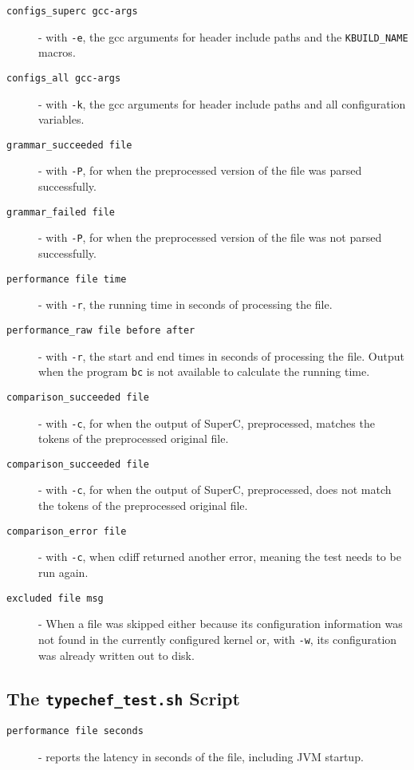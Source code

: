 \documentclass{article}
\newcommand{\SuperC}{{\textsf{Su\-perC}}}
\begin{document}
\begin{description}
\item[\texttt{configs\_superc gcc-args}] - with \verb"-e", the gcc
  arguments for header include paths and the \verb"KBUILD_NAME"
  macros.
\item[\texttt{configs\_all gcc-args}] - with \verb"-k", the gcc
  arguments for header include paths and all configuration variables.
\item[\texttt{grammar\_succeeded file}] - with \verb"-P", for when the
  preprocessed version of the file was parsed successfully.
\item[\texttt{grammar\_failed file}] - with \verb"-P", for when the
  preprocessed version of the file was not parsed successfully.
\item[\texttt{performance file time}] - with \verb"-r", the running
  time in seconds of processing the file.
\item[\texttt{performance\_raw file before after}] - with \verb"-r",
  the start and end times in seconds of processing the file.  Output
  when the program \verb"bc" is not available to calculate the running
  time.
\item[\texttt{comparison\_succeeded file}] - with \verb"-c", for when
  the output of \SuperC{}, preprocessed, matches the tokens of the
  preprocessed original file.
\item[\texttt{comparison\_succeeded file}] - with \verb"-c", for when
  the output of \SuperC{}, preprocessed, does not match the tokens of
  the preprocessed original file.
\item[\texttt{comparison\_error file}] - with \verb"-c", when cdiff
  returned another error, meaning the test needs to be run again.
\item[\texttt{excluded file msg}] - When a file was skipped either
  because its configuration information was not found in the currently
  configured kernel or, with \verb"-w", its configuration was already
  written out to disk.
\end{description}

\subsection{The \texttt{typechef\_test.sh} Script}

\begin{description}
\item[\texttt{performance file seconds}] - reports the latency in
  seconds of the file, including JVM startup.
\end{description}
\end{document}
